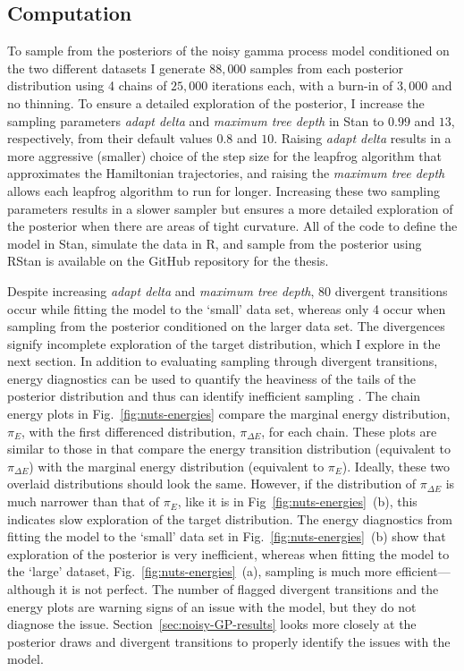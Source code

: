 \subsection{Computation}

To sample from the posteriors of the noisy gamma process model conditioned on the two different datasets I generate $88,000$ samples from each posterior distribution using 4 chains of $25,000$ iterations each, with a burn-in of $3,000$ and no thinning. To ensure a detailed exploration of the posterior, I increase the sampling parameters \textit{adapt delta} and \textit{maximum tree depth} in Stan to $0.99$ and $13$, respectively, from their default values $0.8$ and $10$. Raising \textit{adapt delta} results in a more aggressive (smaller) choice of the step size for the leapfrog algorithm that approximates the Hamiltonian trajectories, and raising the \textit{maximum tree depth} allows each leapfrog algorithm to run for longer. Increasing these two sampling parameters results in a slower sampler but ensures a more detailed exploration of the posterior when there are areas of tight curvature. All of the code to define the model in Stan, simulate the data in R, and sample from the posterior using RStan is available on the GitHub repository for the thesis.

Despite increasing \textit{adapt delta} and \textit{maximum tree depth}, 80 divergent transitions occur while fitting the model to the `small' data set, whereas only 4 occur when sampling from the posterior conditioned on the larger data set. The divergences signify incomplete exploration of the target distribution, which I explore in the next section. In addition to evaluating sampling through divergent transitions, energy diagnostics can be used to quantify the heaviness of the tails of the posterior distribution and thus can identify inefficient sampling \citep{bayesplot}. The chain energy plots in Fig.~\ref{fig:nuts-energies} compare the marginal energy distribution, $\pi_E$, with the first differenced distribution, $\pi_{\Delta E}$, for each chain. These plots are similar to those in \citet{betancourt_2017} that compare the energy transition distribution (equivalent to $\pi_{\Delta E}$) with the marginal energy distribution (equivalent to $\pi_E$). Ideally, these two overlaid distributions should look the same. However, if the distribution of $\pi_{\Delta E}$ is much narrower than that of $\pi_E$, like it is in Fig~\ref{fig:nuts-energies}~(b), this indicates slow exploration of the target distribution. The energy diagnostics from fitting the model to the `small' data set in Fig.~\ref{fig:nuts-energies}~(b) show that exploration of the posterior is very inefficient, whereas when fitting the model to the `large' dataset, Fig.~\ref{fig:nuts-energies}~(a), sampling is much more efficient---although it is not perfect. The number of flagged divergent transitions and the energy plots are warning signs of an issue with the model, but they do not diagnose the issue. Section~\ref{sec:noisy-GP-results} looks more closely at the posterior draws and divergent transitions to properly identify the issues with the model.


